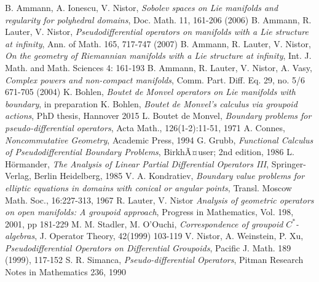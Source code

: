\documentclass[10pt, reqno]{amsart}
\theoremstyle{definition}
\begin{document}
{ \small {
\begin{thebibliography}{99}
 B. Ammann, A. Ionescu, V. Nistor, \emph{Sobolev spaces on Lie manifolds and regularity for polyhedral domains}, Doc. Math. 11, 161-206 (2006) 
 B. Ammann, R. Lauter, V. Nistor, \emph{Pseudodifferential operators on manifolds with a Lie structure at infinity}, Ann. of Math. 165, 717-747 (2007)
 B. Ammann, R. Lauter, V. Nistor, \emph{On the geometry of Riemannian manifolds with a Lie structure at infinity}, Int. J. Math. and Math. Sciences 4: 161-193
 B. Ammann, R. Lauter, V. Nistor, A. Vasy, \emph{Complex powers and non-compact manifolds}, Comm. Part. Diff. Eq. 29, no. 5/6 671-705 (2004)
 K. Bohlen, \emph{Boutet de Monvel operators on Lie manifolds with boundary}, in preparation
 K. Bohlen, \emph{Boutet de Monvel's calculus via groupoid actions}, PhD thesis, Hannover 2015
 L. Boutet de Monvel, \emph{Boundary problems for pseudo-differential operators}, Acta Math., 126(1-2):11-51, 1971
 A. Connes, \emph{Noncommutative Geometry}, Academic Press, 1994
 G. Grubb, \emph{Functional Calculus of Pseudodifferential Boundary Problems}, BirkhÃ¤user; 2nd edition, 1986
 L. H\"ormander, \emph{The Analysis of Linear Partial Differential Operators III}, Springer-Verlag, Berlin Heidelberg, 1985
 V. A. Kondratiev, \emph{Boundary value problems for elliptic equations in domains with conical or angular points}, Transl. Moscow Math. Soc., 16:227-313, 1967
 R. Lauter, V. Nistor \emph{Analysis of geometric operators on open manifolds: A groupoid approach}, Progress in Mathematics, Vol. 198, 2001, pp 181-229
 M. M. Stadler, M. O'Ouchi, \emph{Correspondence of groupoid $C^{\ast}$-algebras}, J. Operator Theory, 42(1999) 103-119
 V. Nistor, A. Weinstein, P. Xu, \emph{Pseudodifferential Operators on Differential Groupoids}, Pacific J. Math. 189 (1999), 117-152
 S. R. Simanca, \emph{Pseudo-differential Operators}, Pitman Research Notes in Mathematics 236, 1990
\end{thebibliography}
}}
\end{document}
